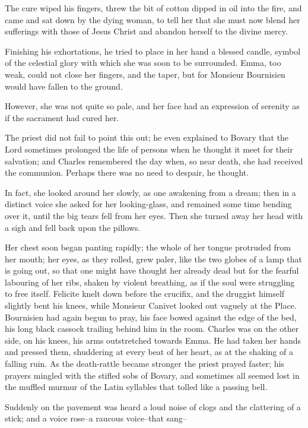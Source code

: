 \documentclass{tufte-book}
\begin{document}
The cure wiped his fingers, threw the bit of cotton dipped in oil into
the fire, and came and sat down by the dying woman, to tell her that
she must now blend her sufferings with those of Jesus Christ and abandon
herself to the divine mercy.

Finishing his exhortations, he tried to place in her hand a blessed
candle, symbol of the celestial glory with which she was soon to be
surrounded. Emma, too weak, could not close her fingers, and the taper,
but for Monsieur Bournisien would have fallen to the ground.

However, she was not quite so pale, and her face had an expression of
serenity as if the sacrament had cured her.

The priest did not fail to point this out; he even explained to Bovary
that the Lord sometimes prolonged the life of persons when he thought it
meet for their salvation; and Charles remembered the day when, so near
death, she had received the communion. Perhaps there was no need to
despair, he thought.

In fact, she looked around her slowly, as one awakening from a dream;
then in a distinct voice she asked for her looking-glass, and remained
some time bending over it, until the big tears fell from her eyes. Then
she turned away her head with a sigh and fell back upon the pillows.

Her chest soon began panting rapidly; the whole of her tongue protruded
from her mouth; her eyes, as they rolled, grew paler, like the two
globes of a lamp that is going out, so that one might have thought
her already dead but for the fearful labouring of her ribs, shaken
by violent breathing, as if the soul were struggling to free itself.
Felicite knelt down before the crucifix, and the druggist himself
slightly bent his knees, while Monsieur Canivet looked out vaguely at
the Place. Bournisien had again begun to pray, his face bowed against
the edge of the bed, his long black cassock trailing behind him in the
room. Charles was on the other side, on his knees, his arms outstretched
towards Emma. He had taken her hands and pressed them, shuddering at
every beat of her heart, as at the shaking of a falling ruin. As the
death-rattle became stronger the priest prayed faster; his prayers
mingled with the stifled sobs of Bovary, and sometimes all seemed lost
in the muffled murmur of the Latin syllables that tolled like a passing
bell.

Suddenly on the pavement was heard a loud noise of clogs and the
clattering of a stick; and a voice rose--a raucous voice--that sang--
\end{document}
